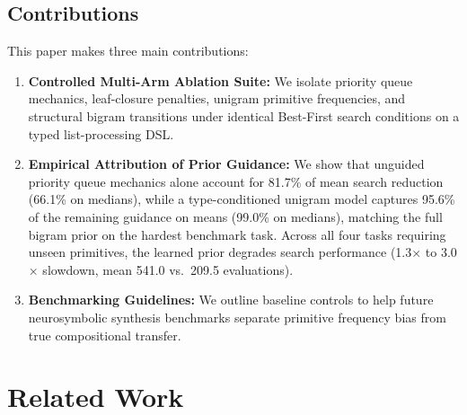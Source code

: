 \documentclass[10pt,twocolumn]{article}
\begin{document}
\subsection{Contributions}
This paper makes three main contributions:
\begin{enumerate}[leftmargin=1.2em, itemsep=0.5pt, parsep=0pt]
    \item \textbf{Controlled Multi-Arm Ablation Suite:} We isolate priority queue mechanics, leaf-closure penalties, unigram primitive frequencies, and structural bigram transitions under identical Best-First search conditions on a typed list-processing DSL.
    \item \textbf{Empirical Attribution of Prior Guidance:} We show that unguided priority queue mechanics alone account for 81.7\% of mean search reduction (66.1\% on medians), while a type-conditioned unigram model captures 95.6\% of the remaining guidance on means (99.0\% on medians), matching the full bigram prior on the hardest benchmark task. Across all four tasks requiring unseen primitives, the learned prior degrades search performance (1.3$\times$ to 3.0$\times$ slowdown, mean 541.0 vs.\ 209.5 evaluations).
    \item \textbf{Benchmarking Guidelines:} We outline baseline controls to help future neurosymbolic synthesis benchmarks separate primitive frequency bias from true compositional transfer.
\end{enumerate}

\section{Related Work}
\end{document}
